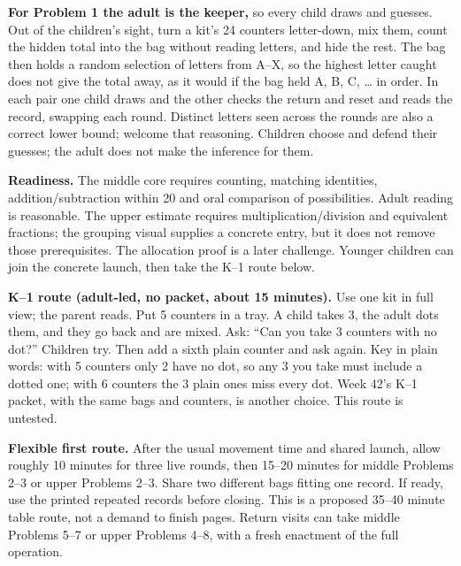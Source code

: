 \documentclass[letterpaper,11pt]{article}
\begin{document}
\textbf{For Problem 1 the adult is the keeper,} so every child draws and guesses. Out of the children's sight, turn a kit's 24 counters letter-down, mix them, count the hidden total into the bag without reading letters, and hide the rest. The bag then holds a random selection of letters from A--X, so the highest letter caught does not give the total away, as it would if the bag held A, B, C, \dots{} in order. In each pair one child draws and the other checks the return and reset and reads the record, swapping each round. Distinct letters seen across the rounds are also a correct lower bound; welcome that reasoning. Children choose and defend their guesses; the adult does not make the inference for them.

\textbf{Readiness.} The middle core requires counting, matching identities, addition/subtraction within 20 and oral comparison of possibilities. Adult reading is reasonable. The upper estimate requires multiplication/division and equivalent fractions; the grouping visual supplies a concrete entry, but it does not remove those prerequisites. The allocation proof is a later challenge. Younger children can join the concrete launch, then take the K--1 route below.

\textbf{K--1 route (adult-led, no packet, about 15 minutes).} Use one kit in full view; the parent reads. Put 5 counters in a tray. A child takes 3, the adult dots them, and they go back and are mixed. Ask: ``Can you take 3 counters with no dot?'' Children try. Then add a sixth plain counter and ask again. Key in plain words: with 5 counters only 2 have no dot, so any 3 you take must include a dotted one; with 6 counters the 3 plain ones miss every dot. Week 42's K--1 packet, with the same bags and counters, is another choice. This route is untested.

\textbf{Flexible first route.} After the usual movement time and shared launch, allow roughly 10 minutes for three live rounds, then 15--20 minutes for middle Problems 2--3 or upper Problems 2--3. Share two different bags fitting one record. If ready, use the printed repeated records before closing. This is a proposed 35--40 minute table route, not a demand to finish pages. Return visits can take middle Problems 5--7 or upper Problems 4--8, with a fresh enactment of the full operation.
\end{document}
